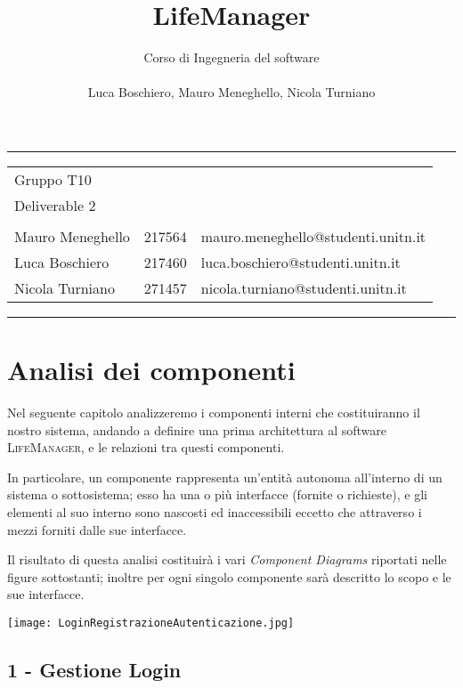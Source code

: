 \documentclass[a4paper,12pt]{article}
\title{LifeManager}
\author{
 Corso di Ingegneria del software\\ \\Luca Boschiero, Mauro Meneghello, Nicola Turniano
 }
\begin{document}
 
 \maketitle
 \thispagestyle{fancy}
\hrule
\begin{table}[!h] 
\begin{tabular}{l l l}
Gruppo T10\\
Deliverable 2\\
 \\
Mauro Meneghello & 217564 & mauro.meneghello@studenti.unitn.it \\
Luca Boschiero & 217460 & luca.boschiero@studenti.unitn.it \\
Nicola Turniano  & 271457 & nicola.turniano@studenti.unitn.it \\
\end{tabular}
\end{table}
\hrule
\vspace{1cm}



\section*{Analisi dei componenti}
Nel seguente capitolo analizzeremo i componenti interni che costituiranno il nostro sistema, andando a definire una prima architettura al software {\scshape LifeManager}, e le relazioni tra questi componenti. 

In particolare, un componente rappresenta un’entità autonoma all’interno di un sistema o sottosistema; esso ha una o più interfacce (fornite o richieste), e gli elementi al suo interno sono nascosti ed inaccessibili eccetto che attraverso i mezzi forniti dalle sue interfacce.


Il risultato di questa analisi costituirà i vari \textit{Component Diagrams }riportati nelle figure sottostanti; inoltre per ogni singolo componente sarà descritto lo scopo e le sue interfacce.

\begin{center}
  \texttt{[image: LoginRegistrazioneAutenticazione.jpg]}
\end{center}

\subsection*{1 - Gestione Login}
\end{document}
